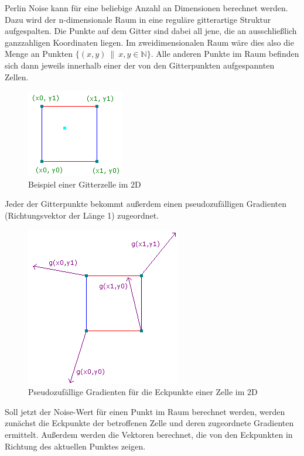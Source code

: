Perlin Noise kann für eine beliebige Anzahl an Dimensionen berechnet werden. Dazu wird der n-dimensionale Raum in eine reguläre gitterartige
Struktur aufgespalten. Die Punkte auf dem Gitter sind dabei all jene, die an ausschließlich ganzzahligen Koordinaten liegen. Im zweidimensionalen
Raum wäre dies also die Menge an Punkten \(\{(x, y) \ \| \ x, y \in \mathbb{N}\}\). Alle anderen Punkte im Raum befinden sich dann jeweils innerhalb
einer der von den Gitterpunkten aufgespannten Zellen.

\begin{figure}[h]
    \centering
    \includegraphics[height=\imgHeight]{images/noise_cell.png}
    \caption{Beispiel einer Gitterzelle im 2D}
    \label{fig:noise_cell}
\end{figure}

Jeder der Gitterpunkte bekommt außerdem einen pseudozufälligen Gradienten (Richtungsvektor der Länge 1) zugeordnet.

\begin{figure}[h]
    \centering
    \includegraphics[height=\imgHeight]{images/noise_gradient.png}
    \caption{Pseudozufällige Gradienten für die Eckpunkte einer Zelle im 2D}
    \label{fig:noise_gradient}
\end{figure}

Soll jetzt der Noise-Wert
für einen Punkt im Raum berechnet werden, werden zunächst die Eckpunkte der betroffenen Zelle und deren zugeordnete Gradienten ermittelt.
Außerdem werden die Vektoren berechnet, die von den Eckpunkten in Richtung des aktuellen Punktes zeigen.


